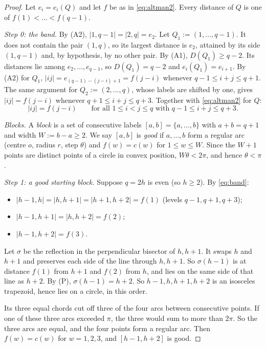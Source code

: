 \begin{proof}
Let $e_i=e_i(Q)$ and let $f$ be as in \eqref{eq:altman2}. Every distance of $Q$ is one of $f(1)<\dots<f(q-1)$.

\emph{Step 0: the band.} By (A2), $|1,q-1|=|2,q|=e_2$. Let $Q_1:=(1,\dots,q-1)$. It does not contain the pair $(1,q)$, so its largest distance is $e_2$, attained by its side $(1,q-1)$ and, by hypothesis, by no other pair. By (A1), $D(Q_1)\ge q-2$. Its distances lie among $e_2,\dots,e_{q-1}$, so $D(Q_1)=q-2$ and $e_i(Q_1)=e_{i+1}$. By (A2) for $Q_1$, $|ij|=e_{(q-1)-(j-i)+1}=f(j-i)$ whenever $q-1\le i+j\le q+1$. The same argument for $Q_2:=(2,\dots,q)$, whose labels are shifted by one, gives $|ij|=f(j-i)$ whenever $q+1\le i+j\le q+3$. Together with \eqref{eq:altman2} for $Q$:
\begin{equation}\label{eq:band}
|ij|=f(j-i)\qquad\text{for all }1\le i<j\le q\text{ with }q-1\le i+j\le q+3 .
\end{equation}

\emph{Blocks.} A \emph{block} is a set of consecutive labels $[a,b]=\{a,\dots,b\}$ with $a+b=q+1$ and width $W:=b-a\ge2$. We say $[a,b]$ is \emph{good} if $a,\dots,b$ form a regular arc (centre $o$, radius $r$, step $\theta$) and $f(w)=c(w)$ for $1\le w\le W$. Since the $W+1$ points are distinct points of a circle in convex position, $W\theta<2\pi$, and hence $\theta<\pi$.

\emph{Step 1: a good starting block.} Suppose $q=2h$ is even (so $h\ge2$). By \eqref{eq:band}:
\begin{itemize}[leftmargin=2em]
\item $|h-1,h|=|h,h+1|=|h+1,h+2|=f(1)$ (levels $q-1,q+1,q+3$);
\item $|h-1,h+1|=|h,h+2|=f(2)$;
\item $|h-1,h+2|=f(3)$.
\end{itemize}
Let $\sigma$ be the reflection in the perpendicular bisector of $h,h+1$. It swaps $h$ and $h+1$ and preserves each side of the line through $h,h+1$. So $\sigma(h-1)$ is at distance $f(1)$ from $h+1$ and $f(2)$ from $h$, and lies on the same side of that line as $h+2$. By (P), $\sigma(h-1)=h+2$. So $h-1,h,h+1,h+2$ is an isosceles trapezoid, hence lies on a circle, in this order.

Its three equal chords cut off three of the four arcs between consecutive points. If one of these three arcs exceeded $\pi$, the three would sum to more than $2\pi$. So the three arcs are equal, and the four points form a regular arc. Then $f(w)=c(w)$ for $w=1,2,3$, and $[h-1,h+2]$ is good.


\end{proof}
